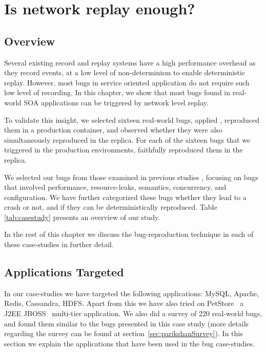 \chapter{Is network replay enough?}
\label{ch:NetworkReplaySurvey}

\section{Overview}
\label{sec:netReplayOverview}

Several existing record and replay systems have a high performance overhead as they record events, at a low level of non-determinism to enable deterministic replay. 
However, most bugs in service oriented application do not require such low level of recording.
In this chapter, we show that most bugs found in real-world SOA applications can be triggered by network level replay.

To validate this insight, we selected sixteen real-world bugs, applied \parikshan, reproduced them in a production container, and observed whether they were also simultaneously reproduced in the replica.
For each of the sixteen bugs that we triggered in the production environments, \parikshan faithfully reproduced them in the replica. 

We selected our bugs from those examined in previous studies \cite{bugbench,simpleTesting}, focusing on bugs that involved performance, resource-leaks, semantics, concurrency, and configuration. 
We have further categorized these bugs whether they lead to a crash or not, and if they can be deterministically reproduced.
Table \ref{tab:casestudy} presents an overview of our study.

In the rest of this chapter we discuss the bug-reproduction technique in each of these case-studies in further detail.



\section{Applications Targeted}

In our case-studies we have targeted the following applications: MySQL, Apache, Redis, Cassandra, HDFS. Apart from this we have also tried \parikshan on PetStore~\cite{petstore} a J2EE JBOSS~\cite{jboss} multi-tier application. We also did a survey of 220 real-world bugs, and found them similar to the bugs presented in this case study (more details regarding the survey can be found at section~\ref{sec:parikshanSurvey}).
In this section we explain the applications that have been used in the bug case-studies.

